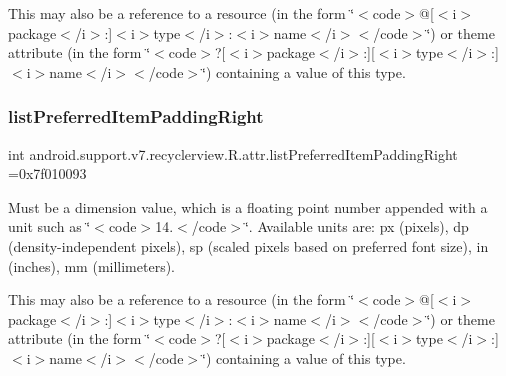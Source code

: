 This may also be a reference to a resource (in the form \char`\"{}$<$code$>$@\mbox{[}$<$i$>$package$<$/i$>$\+:\mbox{]}$<$i$>$type$<$/i$>$\+:$<$i$>$name$<$/i$>$$<$/code$>$\char`\"{}) or theme attribute (in the form \char`\"{}$<$code$>$?\mbox{[}$<$i$>$package$<$/i$>$\+:\mbox{]}\mbox{[}$<$i$>$type$<$/i$>$\+:\mbox{]}$<$i$>$name$<$/i$>$$<$/code$>$\char`\"{}) containing a value of this type. \mbox{\label{classandroid_1_1support_1_1v7_1_1recyclerview_1_1R_1_1attr_ae59071f272b8d6740d54978c23f58a43}} 
\subsubsection{\texorpdfstring{list\+Preferred\+Item\+Padding\+Right}{listPreferredItemPaddingRight}}
{\footnotesize\ttfamily int android.\+support.\+v7.\+recyclerview.\+R.\+attr.\+list\+Preferred\+Item\+Padding\+Right =0x7f010093\hspace{0.3cm}{\ttfamily [static]}}

Must be a dimension value, which is a floating point number appended with a unit such as \char`\"{}$<$code$>$14.\+5sp$<$/code$>$\char`\"{}. Available units are\+: px (pixels), dp (density-\/independent pixels), sp (scaled pixels based on preferred font size), in (inches), mm (millimeters). 

This may also be a reference to a resource (in the form \char`\"{}$<$code$>$@\mbox{[}$<$i$>$package$<$/i$>$\+:\mbox{]}$<$i$>$type$<$/i$>$\+:$<$i$>$name$<$/i$>$$<$/code$>$\char`\"{}) or theme attribute (in the form \char`\"{}$<$code$>$?\mbox{[}$<$i$>$package$<$/i$>$\+:\mbox{]}\mbox{[}$<$i$>$type$<$/i$>$\+:\mbox{]}$<$i$>$name$<$/i$>$$<$/code$>$\char`\"{}) containing a value of this type. \mbox{\label{classandroid_1_1support_1_1v7_1_1recyclerview_1_1R_1_1attr_a0e11a6194e5e18a254443c9b5d53e0e8}} 
